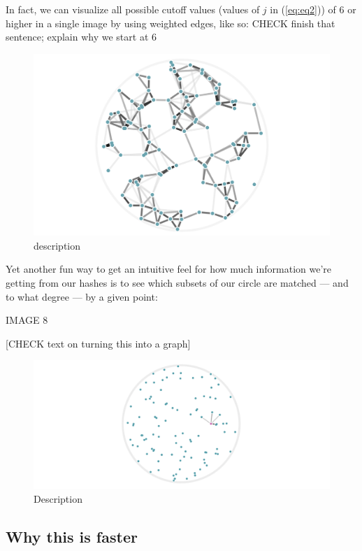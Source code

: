 \documentclass[20pt,]{extarticle}
\begin{document}
In fact, we can visualize all possible cutoff values (values of \(j\) in
(\ref{eq:eq2})) of 6 or higher in a single image by using weighted
edges, like so: CHECK finish that sentence; explain why we start at 6

\begin{figure}
\centering
\includegraphics{images/lsh_image6.png}
\caption{description}
\end{figure}

Yet another fun way to get an intuitive feel for how much information
we're getting from our hashes is to see which subsets of our circle are
matched --- and to what degree --- by a given point:

IMAGE 8

{[}CHECK text on turning this into a graph{]}

\begin{figure}
\centering
\includegraphics{images/image8b@2x.gif}
\caption{Description}
\end{figure}

\subsection{Why this is faster}\label{why-this-is-faster}
\end{document}
